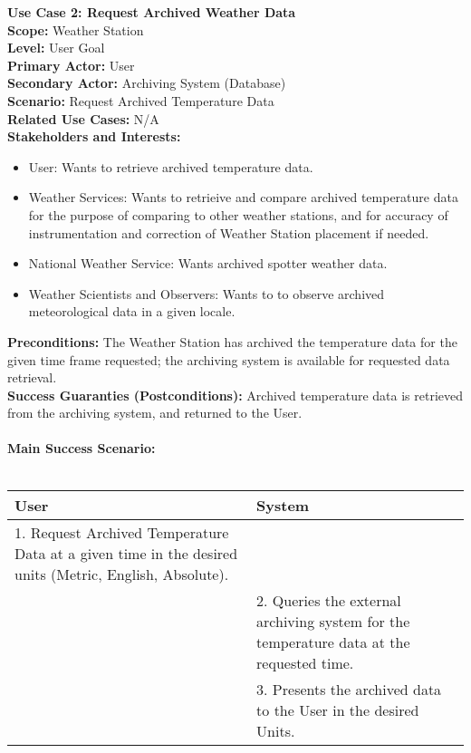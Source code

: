 \documentclass[letterpaper]{article}
\begin{document}
\noindent
\textbf{Use Case 2:  Request Archived Weather Data}\\
\textbf{Scope:  }Weather Station\\
\textbf{Level:  }User Goal\\
\textbf{Primary Actor:  }User\\
\textbf{Secondary Actor:  }Archiving System (Database)\\
\textbf{Scenario:  }Request Archived Temperature Data\\
\textbf{Related Use Cases:  }N/A\\
\textbf{Stakeholders and Interests:  }
\begin{itemize}
\item User:  Wants to retrieve archived temperature data.
\item Weather Services:  Wants to retrieive and compare archived
temperature data for the purpose of comparing to other weather
stations, and for accuracy of instrumentation and correction of
Weather Station placement if needed.
\item National Weather Service:  Wants archived spotter weather data.
\item Weather Scientists and Observers:  Wants to to observe archived
meteorological data in a given locale.
\end{itemize}
\textbf{Preconditions:  }The Weather Station has archived the
temperature data for the given time frame requested; the archiving
system is available for requested data retrieval.\\
\textbf{Success Guaranties (Postconditions):  }Archived temperature
data is retrieved from the archiving system, and returned to the
User.\\\\
\textbf{Main Success Scenario:  }\\\\
\begin{tabular}{|p{6cm}|p{6cm}|}\hline
\textbf{User} & \textbf{System}\\\hline
1. Request Archived Temperature Data at a given time in the desired
units (Metric, English, Absolute).&\\\hline
&2.  Queries the external archiving system for the temperature
data at the requested time.\\\hline
&3.  Presents the archived data to the User in the desired
Units.\\\hline
\end{tabular}\\\\
\end{document}
